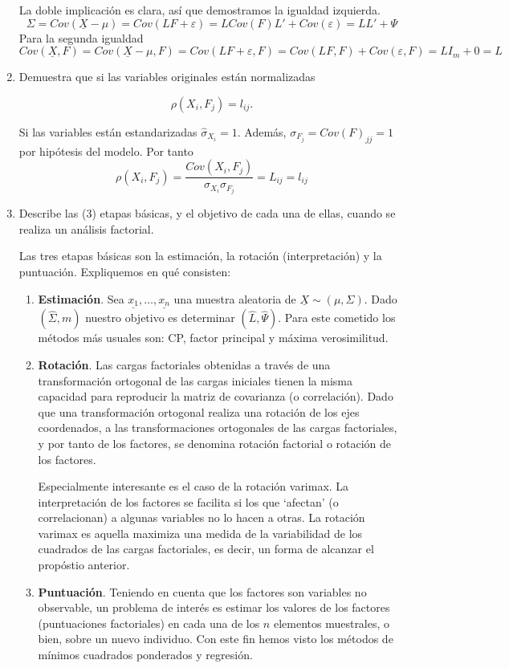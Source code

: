 \documentclass[twoside]{article}
\newcommand{\muestra}[1]{{\underline{#1}}}
\newcommand{\mX}{{\muestra{X}}}
\begin{document}
\begin{enumerate}
La doble implicación es clara, así que demostramos la igualdad izquierda.
$$
\Sigma = Cov(\mX-\mu) = Cov(LF+\varepsilon) = LCov(F)L' + Cov(\varepsilon) = LL'+\Psi
$$
Para la segunda igualdad
$$
Cov(\mX,F) = Cov(\mX-\mu,F) = Cov(LF+\varepsilon,F) = Cov(LF,F)+Cov(\varepsilon,F) = LI_m + 0 = L
$$
\item Demuestra que si las variables originales están normalizadas

\[ \rho(X_i, F_j) = l_{ij}. \]

Si las variables están estandarizadas $\hat{\sigma}_{X_i}=1$. Además, $\sigma_{F_j}=Cov(F)_{jj} = 1$ por hipótesis del modelo. Por tanto
$$
\rho(X_i,F_j) = \frac{Cov(X_i,F_j)}{\sigma_{X_i}\sigma_{F_j}} = L_{ij} = l_{ij}
$$
\item Describe las (3) etapas básicas, y el objetivo de cada una de ellas, cuando se realiza un análisis factorial.

Las tres etapas básicas son la estimación, la rotación (interpretación) y la puntuación. Expliquemos en qué consisten:

\begin{enumerate}
\item \textbf{Estimación}. Sea $\muestra{x_1},\dotsc,\muestra{x_n}$ una muestra aleatoria de $\mX\sim (\mu,\Sigma)$. Dado $(\hat{\Sigma},m)$ nuestro objetivo es determinar $(\hat{L},\hat{\Psi})$. Para este cometido los métodos más usuales son: CP, factor principal y máxima verosimilitud.
\item \textbf{Rotación}. Las cargas factoriales obtenidas a través de una transformación ortogonal de las cargas iniciales tienen la misma capacidad para reproducir la matriz de covarianza (o correlación). Dado que una transformación ortogonal realiza una rotación de los ejes coordenados, a las transformaciones ortogonales de las cargas factoriales, y por tanto de los factores, se denomina rotación factorial o rotación de los factores.

Especialmente interesante es el caso de la rotación varimax. La interpretación de los factores se facilita si los que `afectan' (o correlacionan) a algunas variables no lo hacen a otras. La rotación varimax es aquella maximiza una medida de la variabilidad de los cuadrados de las cargas factoriales, es decir, un forma de alcanzar el propóstio anterior.

\item \textbf{Puntuación}. Teniendo en cuenta que los factores son variables no observable, un problema de interés
es estimar los valores de los factores (puntuaciones factoriales) en cada una de los $n$ elementos muestrales, o bien, sobre un nuevo individuo. Con este fin hemos visto los métodos de mínimos cuadrados ponderados y regresión.
\end{enumerate}


\end{enumerate}
\end{document}
